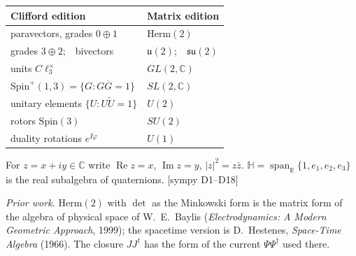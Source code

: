 \documentclass[10pt]{article}
\newcommand{\Cp}{\mathbb{C}}
\newcommand{\tg}[1]{{\scriptsize[#1]}}
\begin{document}
\begin{sheetbox}
{\begin{minipage}[t]{0.46\linewidth}
\begin{tabular}[t]{@{}l l@{}}
\toprule
\textbf{Clifford edition} & \textbf{Matrix edition}\\
\midrule
paravectors, grades $0\oplus1$ & $\mathrm{Herm}(2)$\\
grades $3\oplus2$;\ \ bivectors & $\mathfrak u(2)$;\ \ $\mathfrak{su}(2)$\\
units $C\ell_3^\times$ & $GL(2,\Cp)$\\
$\mathrm{Spin}^+(1,3)=\{G:G\overline G=1\}$ & $SL(2,\Cp)$\\
unitary elements $\{U:U\widetilde U=1\}$ & $U(2)$\\
rotors $\mathrm{Spin}(3)$ & $SU(2)$\\
duality rotations $e^{I\varphi}$ & $U(1)$\\
\bottomrule
\end{tabular}
\end{minipage}}\par\vspace{3pt}
For $z=x+iy\in\Cp$ write $\operatorname{Re}z=x$, $\operatorname{Im}z=y$, $|z|^2=z\bar z$. $\mathbb H=\operatorname{span}_{\mathbb R}\{1,e_1,e_2,e_3\}$ is the real subalgebra of quaternions. \tg{sympy D1--D18}\par\vspace{2pt}
{\footnotesize\textit{Prior work.} $\mathrm{Herm}(2)$ with $\det$ as the Minkowski form is the matrix form of the algebra of physical space of W.~E.~Baylis (\textit{Electrodynamics: A Modern Geometric Approach}, 1999); the spacetime version is D.~Hestenes, \textit{Space-Time Algebra} (1966). The closure $JJ^\dagger$ has the form of the current $\Psi\Psi^\dagger$ used there.}
\end{sheetbox}
\end{document}

